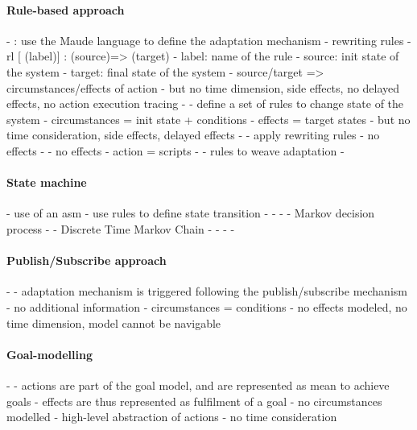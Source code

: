 \paragraph{Rule-based approach}
- \cite{DBLP:conf/icse/TaharaOH17}: use the Maude language to define the adaptation mechanism
	- rewriting rules
	- rl [ (label)] : (source)=> (target)
		- label: name of the rule
		- source: init state of the system
		- target: final state of the system
	- source/target => circumstances/effects of action
	 - but no time dimension, side effects, no delayed effects, no action execution tracing
- \cite{DBLP:conf/icse/ArcainiRS15}
	- define a set of rules to change state of the system
	- circumstances = init state + conditions
	- effects = target states
		- but no time consideration, side effects, delayed effects
- \cite{DBLP:conf/wrla/BruniCGLV12}
	- apply rewriting rules
	- no effects 
- \cite{DBLP:conf/eurosys/GraceHPBCT08}
	- no effects
	- action = scripts
- \cite{DBLP:conf/gpce/PintoFT03}
	- rules to weave adaptation
- \cite{DBLP:journals/computer/GarlanCHSS04}
		
\paragraph{State machine}
- \cite{DBLP:conf/icse/ArcainiRS15} use of an \gls{asm}
	- use rules to define state transition
- \cite{DBLP:conf/icse/IftikharW14a}
- \cite{DBLP:conf/smartgridsec/0001FKNT14}
- \cite{DBLP:conf/sigsoft/MorenoCGS15}
	- Markov decision process
- \cite{DBLP:conf/kbse/FilieriGLM11}
	- Discrete Time Markov Chain
- \cite{DBLP:conf/wetice/DjoudiBZ14}
- \cite{DBLP:conf/aosd/ZhangGC09}
- \cite{DBLP:conf/icse/GhezziPST13}
- \cite{DBLP:conf/kbse/TajalliGEM10}
		 
\paragraph{Publish/Subscribe approach}
- \cite{DBLP:conf/icse/BarbosaLMJ17}
	- adaptation mechanism is triggered following the publish/subscribe mechanism
	- no additional information
	- circumstances = conditions
	- no effects modeled, no time dimension, model cannot be navigable
	
\paragraph{Goal-modelling}
- \cite{DBLP:conf/icse/MendoncaAR14, DBLP:conf/iceccs/BencomoWSW12}
	- actions are part of the goal model, and are represented as mean to achieve goals
	- effects are thus represented as fulfilment of a goal
	- no circumstances modelled
	- high-level abstraction of actions
	- no time consideration
	

